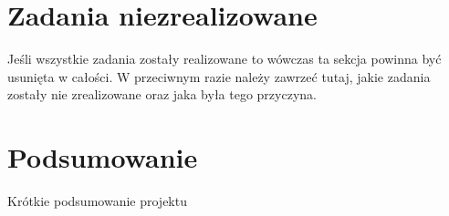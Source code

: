 \documentclass[10pt, a4paper]{article}
\begin{document}
\section{Zadania niezrealizowane}

Jeśli wszystkie zadania zostały realizowane to wówczas 
ta sekcja powinna być usunięta w całości. W przeciwnym razie
należy zawrzeć tutaj, jakie zadania zostały nie zrealizowane 
oraz jaka była tego przyczyna.

\section{Podsumowanie}

Krótkie podsumowanie projektu

\newpage
{}


\end{document}
